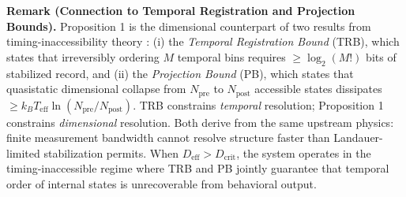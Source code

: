 \documentclass[12pt]{article}
\begin{document}
\textbf{Remark (Connection to Temporal Registration and Projection Bounds).} Proposition 1 is the dimensional counterpart of two results from timing-inaccessibility theory \cite{todd2025maxwell}: (i) the \textit{Temporal Registration Bound} (TRB), which states that irreversibly ordering $M$ temporal bins requires $\ge \log_2(M!)$ bits of stabilized record, and (ii) the \textit{Projection Bound} (PB), which states that quasistatic dimensional collapse from $N_{\text{pre}}$ to $N_{\text{post}}$ accessible states dissipates $\ge k_B T_{\text{eff}} \ln(N_{\text{pre}}/N_{\text{post}})$. TRB constrains \textit{temporal} resolution; Proposition 1 constrains \textit{dimensional} resolution. Both derive from the same upstream physics: finite measurement bandwidth cannot resolve structure faster than Landauer-limited stabilization permits. When $D_{\text{eff}} > D_{\text{crit}}$, the system operates in the timing-inaccessible regime where TRB and PB jointly guarantee that temporal order of internal states is unrecoverable from behavioral output.
\end{document}
